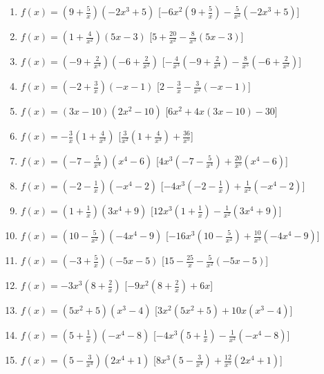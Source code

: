 \begin{enumerate}
\begin{enumerate}
\item \(f(x) = \left(9 + \frac{5}{x}\right) \left(- 2 x^{3} + 5\right)\) \hfill 
[\(- 6 x^{2} \left(9 + \frac{5}{x}\right) - \frac{5}{x^{2}} \left(- 2 x^{3} + 
5\right)\)]
\item \(f(x) = \left(1 + \frac{4}{x^{2}}\right) \left(5 x - 3\right)\) \hfill 
[\(5 + \frac{20}{x^{2}} - \frac{8}{x^{3}} \left(5 x - 3\right)\)]
\item \(f(x) = \left(-9 + \frac{2}{x^{4}}\right) \left(-6 + 
\frac{2}{x^{2}}\right)\) \hfill [\(- \frac{4}{x^{3}} \left(-9 + 
\frac{2}{x^{4}}\right) - \frac{8}{x^{5}} \left(-6 + \frac{2}{x^{2}}\right)\)]
\item \(f(x) = \left(-2 + \frac{3}{x}\right) \left(- x - 1\right)\) \hfill [\(2 
- \frac{3}{x} - \frac{3}{x^{2}} \left(- x - 1\right)\)]
\item \(f(x) = \left(3 x - 10\right) \left(2 x^{2} - 10\right)\) \hfill [\(6 
x^{2} + 4 x \left(3 x - 10\right) - 30\)]
\item \(f(x) = - \frac{3}{x} \left(1 + \frac{4}{x^{3}}\right)\) \hfill 
[\(\frac{3}{x^{2}} \left(1 + \frac{4}{x^{3}}\right) + \frac{36}{x^{5}}\)]
\item \(f(x) = \left(-7 - \frac{5}{x^{4}}\right) \left(x^{4} - 6\right)\) \hfill 
[\(4 x^{3} \left(-7 - \frac{5}{x^{4}}\right) + \frac{20}{x^{5}} \left(x^{4} - 
6\right)\)]
\item \(f(x) = \left(-2 - \frac{1}{x}\right) \left(- x^{4} - 2\right)\) \hfill 
[\(- 4 x^{3} \left(-2 - \frac{1}{x}\right) + \frac{1}{x^{2}} \left(- x^{4} - 
2\right)\)]
\item \(f(x) = \left(1 + \frac{1}{x}\right) \left(3 x^{4} + 9\right)\) \hfill 
[\(12 x^{3} \left(1 + \frac{1}{x}\right) - \frac{1}{x^{2}} \left(3 x^{4} + 
9\right)\)]
\item \(f(x) = \left(10 - \frac{5}{x^{2}}\right) \left(- 4 x^{4} - 9\right)\) 
\hfill [\(- 16 x^{3} \left(10 - \frac{5}{x^{2}}\right) + \frac{10}{x^{3}} 
\left(- 4 x^{4} - 9\right)\)]
\item \(f(x) = \left(-3 + \frac{5}{x}\right) \left(- 5 x - 5\right)\) \hfill 
[\(15 - \frac{25}{x} - \frac{5}{x^{2}} \left(- 5 x - 5\right)\)]
\item \(f(x) = - 3 x^{3} \left(8 + \frac{2}{x}\right)\) \hfill [\(- 9 x^{2} 
\left(8 + \frac{2}{x}\right) + 6 x\)]
\item \(f(x) = \left(5 x^{2} + 5\right) \left(x^{3} - 4\right)\) \hfill [\(3 
x^{2} \left(5 x^{2} + 5\right) + 10 x \left(x^{3} - 4\right)\)]
\item \(f(x) = \left(5 + \frac{1}{x}\right) \left(- x^{4} - 8\right)\) \hfill 
[\(- 4 x^{3} \left(5 + \frac{1}{x}\right) - \frac{1}{x^{2}} \left(- x^{4} - 
8\right)\)]
\item \(f(x) = \left(5 - \frac{3}{x^{4}}\right) \left(2 x^{4} + 1\right)\) 
\hfill [\(8 x^{3} \left(5 - \frac{3}{x^{4}}\right) + \frac{12}{x^{5}} \left(2 
x^{4} + 1\right)\)]
 \end{enumerate}


\end{enumerate}

